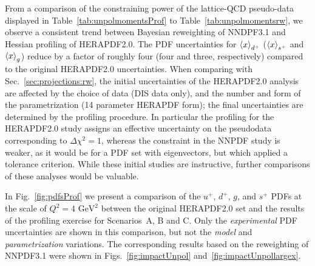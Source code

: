 From a comparison of the constraining power of the lattice-QCD pseudo-data  
displayed in Table~\ref{tab:unpolmomentsProf} to Table~\ref{tab:unpolmomentsrw},
we observe a consistent trend between Bayesian reweighting of NNDPF3.1 and 
Hessian profiling of HERAPDF2.0.
%
The PDF uncertainties for $\left\langle x\right\rangle_{d^+}$ ($\left\langle x\right\rangle_{s^+}$
and  $\left\langle x\right\rangle_g$) reduce by a factor of roughly
four (four and three, respectively) compared to the original
HERAPDF2.0 uncertainties.
%
When comparing with Sec.~\ref{sec:projections:rw},
the initial uncertainties of the HERAPDF2.0  analysis 
are affected by the choice of data (DIS data only), and 
the number and form of the parametrization (14 parameter HERAPDF form);
the final uncertainties are determined by the profiling procedure. 
%
In particular the profiling for the HERAPDF2.0 study assigns an effective 
uncertainty on the pseudodata corresponding to $\Delta\chi^2=1$, whereas the 
constraint in the NNPDF study is weaker, as it would be for a PDF set with 
eigenvectors, but which applied a tolerance criterion. 
%
While these initial studies are instructive, 
further comparisons of these analyses would be valuable. 

In Fig.~\ref{fig:pdfsProf} we present a comparison of the
$u^+$, $d^+$, $g$, and $s^+$ PDFs at the scale of $Q^2=4\text{ GeV}^2$
between the original  HERAPDF2.0 set and the results of the profiling
exercise for Scenarios~A, B and C.
%
Only the {\it experimental} PDF uncertainties are shown in this comparison,
but not the {\it model} and {\it parametrization} variations.
%
The corresponding results based on the reweighting
of NNPDF3.1 were shown in Figs.~\ref{fig:impactUnpol}
and~\ref{fig:impactUnpollargex}.

